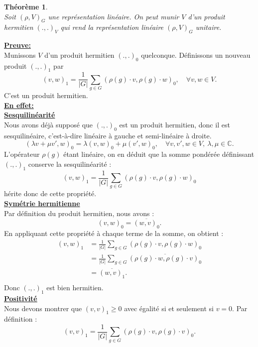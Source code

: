 \documentclass[a4paper, 14pt]{report}
\newtheorem{theorem}{Théorème}[section]
\begin{document}
\begin{onehalfspace}
{			
			\begin{theorem} \cite{renard2009groupes}\\
				Soit \( (\rho, V)_{G}\) une représentation linéaire. On peut munir \( V \) d’un produit hermitien \( (.,.)_V \) qui rend la représentation linéaire \( (\rho, V)_{G}\) unitaire.\\
			\end{theorem}
			
			\textbf{\underline{Preuve:}}  \\
			Munissons \( V \) d’un produit hermitien \( (.,.)_0 \) quelconque. Définissons un nouveau produit  \( (.,.)_1 \)  par  
			\[
			(v, w)_1 = \frac{1}{|G|} \sum_{g \in G} (\rho(g) \cdot v, \rho(g) \cdot w)_0, \quad \forall v, w \in V.
			\]
			C'est un produit hermitien.\\
			\textbf{\underline{En effet:}}\\ 
			\textbf{\underline{Sesquilinéarité}}\\   
			Nous avons déjà supposé que \( (.,.)_0 \) est un produit hermitien, donc il est sesquilinéaire, c'est-à-dire linéaire à gauche et semi-linéaire à droite. 
			\[
			(\lambda v + \mu v', w)_0 = \lambda (v, w)_0 + \mu (v', w)_0, \quad \forall v, v', w \in V, \ \lambda, \mu \in \mathbb{C}.
			\]
			L'opérateur \( \rho(g) \) étant linéaire, on en déduit que la somme pondérée définissant \( (.,.)_1 \) conserve la sesquilinéarité :  
			\[
			(v, w)_1 = \frac{1}{|G|} \sum_{g \in G} (\rho(g) \cdot v, \rho(g) \cdot w)_0
			\]
			hérite donc de cette propriété.\\
			\textbf{\underline{Symétrie hermitienne}}\\  
			Par définition du produit hermitien, nous avons :  
			\[
			(v, w)_0 = \overline{(w, v)_0}.
			\]
			En appliquant cette propriété à chaque terme de la somme, on obtient :
			\begin{align*}
				(v, w)_1 
				&= \frac{1}{|G|} \sum_{g \in G} (\rho(g) \cdot v, \rho(g) \cdot w)_0 \\
				&= \frac{1}{|G|} \sum_{g \in G} \overline{(\rho(g) \cdot w, \rho(g) \cdot v)_0} \\
				&= \overline{(w, v)_1}. \\
			\end{align*}
			Donc \( (.,.)_1 \) est bien hermitien.\\
			\textbf{\underline{Positivité }}\\  
			Nous devons montrer que \( (v, v)_1 \geq 0 \) avec égalité si et seulement si \( v = 0 \). Par définition :
			\[
			(v, v)_1 = \frac{1}{|G|} \sum_{g \in G} (\rho(g) \cdot v, \rho(g) \cdot v)_0.
\]}
\end{onehalfspace}
\end{document}
